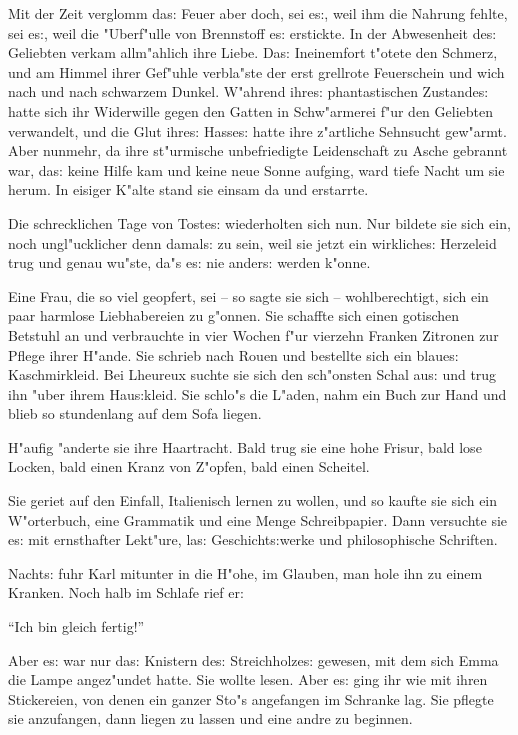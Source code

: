 \documentclass[oneside,12pt]{book}
\newcommand{\s}{s:}%
\begin{document}
Mit der Zeit verglomm da{\s} Feuer aber doch, sei e{\s}, weil ihm
die Nahrung fehlte, sei e{\s}, weil die "Uberf"ulle von Brennstoff
e{\s} erstickte. In der Abwesenheit de{\s} Geliebten verkam
allm"ahlich ihre Liebe. Da{\s} Ineinemfort t"otete den Schmerz,
und am Himmel ihrer Gef"uhle verbla"ste der erst grellrote
Feuerschein und wich nach und nach schwarzem Dunkel. W"ahrend
ihre{\s} phantastischen Zustande{\s} hatte sich ihr Widerwille
gegen den Gatten in Schw"armerei f"ur den Geliebten verwandelt,
und die Glut ihre{\s} Hasse{\s} hatte ihre z"artliche Sehnsucht
gew"armt. Aber nunmehr, da ihre st"urmische unbefriedigte
Leidenschaft zu Asche gebrannt war, da{\s} keine Hilfe kam und
keine neue Sonne aufging, ward tiefe Nacht um sie herum. In
eisiger K"alte stand sie einsam da und erstarrte.

Die schrecklichen Tage von Toste{\s} wiederholten sich nun. Nur
bildete sie sich ein, noch ungl"ucklicher denn damal{\s} zu sein,
weil sie jetzt ein wirkliche{\s} Herzeleid trug und genau wu"ste,
da"s e{\s} nie ander{\s} werden k"onne.

Eine Frau, die so viel geopfert, sei -- so sagte sie sich --
wohlberechtigt, sich ein paar harmlose Liebhabereien zu g"onnen.
Sie schaffte sich einen gotischen Betstuhl an und verbrauchte in
vier Wochen f"ur vierzehn Franken Zitronen zur Pflege ihrer
H"ande. Sie schrieb nach Rouen und bestellte sich ein blaue{\s}
Kaschmirkleid. Bei Lheureux suchte sie sich den sch"onsten Schal
au{\s} und trug ihn "uber ihrem Hau{\s}kleid. Sie schlo"s die
L"aden, nahm ein Buch zur Hand und blieb so stundenlang auf dem
Sofa liegen.

H"aufig "anderte sie ihre Haartracht. Bald trug sie eine hohe
Frisur, bald lose Locken, bald einen Kranz von Z"opfen, bald einen
Scheitel.

Sie geriet auf den Einfall, Italienisch lernen zu wollen, und so
kaufte sie sich ein W"orterbuch, eine Grammatik und eine Menge
Schreibpapier. Dann versuchte sie e{\s} mit ernsthafter Lekt"ure,
la{\s} Geschicht{\s}werke und philosophische Schriften.

Nacht{\s} fuhr Karl mitunter in die H"ohe, im Glauben, man hole
ihn zu einem Kranken. Noch halb im Schlafe rief er:

"`Ich bin gleich fertig!"'

Aber e{\s} war nur da{\s} Knistern de{\s} Streichholze{\s}
gewesen, mit dem sich Emma die Lampe angez"undet hatte. Sie wollte
lesen. Aber e{\s} ging ihr wie mit ihren Stickereien, von denen
ein ganzer Sto"s angefangen im Schranke lag. Sie pflegte sie
anzufangen, dann liegen zu lassen und eine andre zu beginnen.
\end{document}
